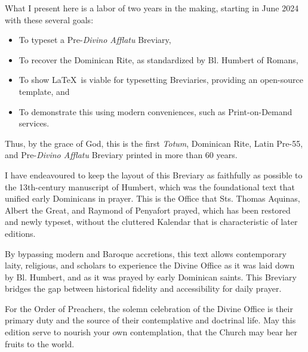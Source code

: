 What I present here is a labor of two years in the making, starting in June 2024 with these several goals:
\begin{itemize}[nosep]
	\item To typeset a Pre-\textit{Divino Afflatu} Breviary,
	\item To recover the Dominican Rite, as standardized by Bl. Humbert of Romans,
	\item To show \LaTeX \ is viable for typesetting Breviaries, providing an open-source template, and
	\item To demonstrate this using modern conveniences, such as Print-on-Demand services.
\end{itemize}

Thus, by the grace of God, this is the first \emph{Totum}, Dominican Rite, Latin Pre-55, and Pre-\textit{Divino Afflatu} Breviary printed in more than 60 years.

I have endeavoured to keep the layout of this Breviary as faithfully as possible to the 13th-century manuscript of Humbert, which was the foundational text that unified early Dominicans in prayer. This is the Office that Sts. Thomas Aquinas, Albert the Great, and Raymond of Penyafort prayed, which has been restored and newly typeset, without the cluttered Kalendar that is characteristic of later editions.

By bypassing modern and Baroque accretions, this text allows contemporary laity, religious, and scholars to experience the Divine Office as it was laid down by Bl. Humbert, and as it was prayed by early Dominican saints. This Breviary bridges the gap between historical fidelity and accessibility for daily prayer.

For the Order of Preachers, the solemn celebration of the Divine Office is their primary duty and the source of their contemplative and doctrinal life. May this edition serve to nourish your own contemplation, that the Church may bear her fruits to the world.


